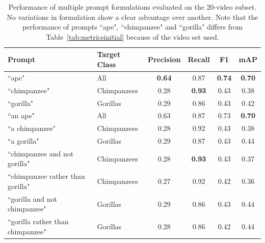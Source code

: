 \documentclass[author={Jacob Stephenson},
    degree={BSc},
    title={Robust Great Ape Species Detection in Wild Camera Trap Imagery with Promptable Concept Segmentation},
    unit={COMS30045},
    subtitle={}]{dissertation}
\begin{document}
\begin{table}[h]
    \centering

    \begin{tabular}{ll|cccc}
            \toprule
    
            \textbf{Prompt} & \textbf{Target Class} & \textbf{Precision} & \textbf{Recall} & \textbf{F1} & \textbf{mAP} \\

            \midrule
            
            ``ape" & All & \textbf{0.64} & 0.87 & \textbf{0.74} & \textbf{0.70} \\
            
            ``chimpanzee" & Chimpanzees & 0.28 & \textbf{0.93} & 0.43 & 0.38 \\
            
            ``gorilla" & Gorillas & 0.29 & 0.86 & 0.43 & 0.42 \\

            \midrule

            ``an ape" & All & 0.63 & 0.87 & 0.73 & \textbf{0.70} \\
            
            ``a chimpanzee" & Chimpanzees & 0.28 & 0.92 & 0.43 & 0.38 \\
            
            ``a gorilla" & Gorillas & 0.29 & 0.87 & 0.43 & 0.44 \\
    
            \midrule
            
            ``chimpanzee and not gorilla" & Chimpanzees & 0.28 & \textbf{0.93} & 0.43 & 0.37 \\
            
            ``chimpanzee rather than gorilla" & Chimpanzees & 0.27 & 0.92 & 0.42 & 0.36 \\

            ``gorilla and not chimpanzee" & Gorillas & 0.29 & 0.86 & 0.43 & 0.44 \\
    
            ``gorilla rather than chimpanzee" & Gorillas & 0.28 & 0.86 & 0.42 & 0.44 \\
            
            \bottomrule
    \end{tabular}

    \caption[Prompt formulations]{Performance of multiple prompt formulations evaluated on the 20-video subset. No variations in formulation show a clear advantage over another. Note that the performance of prompts ``ape", ``chimpanzee" and ``gorilla" differs from Table~\ref{tab:metricsinitial} because of the video set used.}
    \label{tab:promptformulations}
\end{table}
\end{document}
